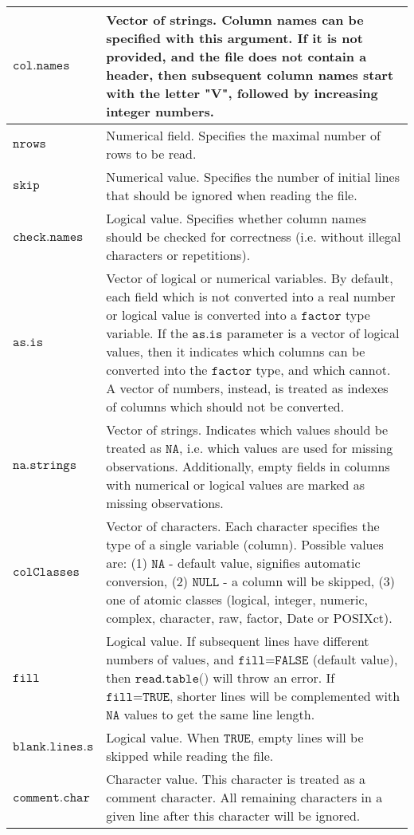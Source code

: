 \documentclass[]{book}
\theoremstyle{definition}
\theoremstyle{definition}
\theoremstyle{definition}
\theoremstyle{remark}
\begin{document}
\begin{table}
\begin{tabular}[t]{>{}l||>{\raggedright\arraybackslash}p{35em}}
\hline
$\texttt{col.names}$ & Vector of strings. Column names can be specified with this argument. If it is not provided, and the file does not contain a header, then subsequent column names start with the letter "V", followed by increasing integer numbers.\\
\hline
$\texttt{nrows}$ & Numerical field. Specifies the maximal number of rows to be read.\\
\hline
$\texttt{skip}$ & Numerical value. Specifies the number of initial lines that should be ignored when reading the file.\\
\hline
$\texttt{check.names}$ & Logical value. Specifies whether column names should be checked for correctness (i.e. without illegal characters or repetitions).\\
\hline
$\texttt{as.is}$ & Vector of logical or numerical variables. By default, each field which is not converted into a real number or logical value is converted into a $\texttt{factor}$ type variable. If the $\texttt{as.is}$ parameter is a vector of logical values, then it indicates which columns can be converted into the $\texttt{factor}$ type, and which cannot. A vector of numbers, instead, is treated as indexes of columns which should not be converted.\\
\hline
$\texttt{na.strings}$ & Vector of strings. Indicates which values should be treated as $\texttt{NA}$, i.e. which values are used for missing observations. Additionally, empty fields in columns with numerical or logical values are marked as missing observations.\\
\hline
$\texttt{colClasses}$ & Vector of characters. Each character specifies the type of a single variable (column). Possible values are: (1) $\texttt{NA}$ - default value, signifies automatic conversion, (2) $\texttt{NULL}$ - a column will be skipped, (3) one of atomic classes (logical, integer, numeric, complex, character, raw, factor, Date or POSIXct).\\
\hline
$\texttt{fill}$ & Logical value. If subsequent lines have different numbers of values, and $\texttt{fill=FALSE}$ (default value), then $\texttt{read.table()}$ will throw an error. If $\texttt{fill=TRUE}$, shorter lines will be complemented with $\texttt{NA}$ values to get the same line length.\\
\hline
$\texttt{blank.lines.s}$ & Logical value. When $\texttt{TRUE}$, empty lines will be skipped while reading the file.\\
\hline
$\texttt{comment.char}$ & Character value. This character is treated as a comment character. All remaining characters in a given line after this character will be ignored.\\

\end{tabular}
\end{table}
\end{document}
